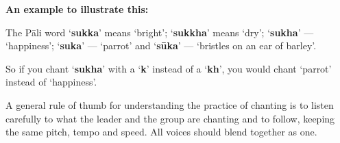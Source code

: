 \ifhandbookedition
\clearpage
\fi

\textbf{An example to illustrate this:}

The Pāli word ‘\textbf{sukka}’ means ‘bright’; ‘\textbf{sukkha}’ means
‘dry’; ‘\textbf{sukha}’ --- ‘happiness’; ‘\textbf{suka}’ --- ‘parrot’ and
‘\textbf{sūka}’ --- ‘bristles on an ear of barley’.

So if you chant ‘\textbf{sukha}’ with a ‘\textbf{k}’ instead of a
‘\textbf{kh}’, you would chant ‘parrot’ instead of ‘happiness’.

A general rule of thumb for understanding the practice of chanting is to
listen carefully to what the leader and the group are chanting and to
follow, keeping the same pitch, tempo and speed. All voices should blend
together as one.

%
% 
% 
% 
% 
% 

